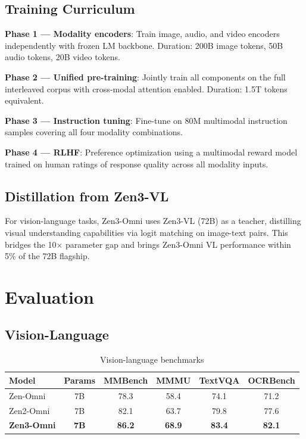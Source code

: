 \documentclass[11pt,a4paper]{article}
\begin{document}
\subsection{Training Curriculum}

\textbf{Phase 1 --- Modality encoders}: Train image, audio, and video encoders
independently with frozen LM backbone. Duration: 200B image tokens, 50B audio tokens,
20B video tokens.

\textbf{Phase 2 --- Unified pre-training}: Jointly train all components on the full
interleaved corpus with cross-modal attention enabled. Duration: 1.5T tokens equivalent.

\textbf{Phase 3 --- Instruction tuning}: Fine-tune on 80M multimodal instruction samples
covering all four modality combinations.

\textbf{Phase 4 --- RLHF}: Preference optimization using a multimodal reward model
trained on human ratings of response quality across all modality inputs.

\subsection{Distillation from Zen3-VL}

For vision-language tasks, Zen3-Omni uses Zen3-VL (72B) as a teacher, distilling
visual understanding capabilities via logit matching on image-text pairs. This
bridges the 10$\times$ parameter gap and brings Zen3-Omni VL performance within
5\% of the 72B flagship.

\section{Evaluation}
\label{sec:eval}

\subsection{Vision-Language}

\begin{table}[H]
\centering
\caption{Vision-language benchmarks}
\begin{tabular}{lccccc}
\toprule
\textbf{Model} & \textbf{Params} & \textbf{MMBench} & \textbf{MMMU} & \textbf{TextVQA} & \textbf{OCRBench} \\
\midrule
Zen-Omni     & 7B & 78.3 & 58.4 & 74.1 & 71.2 \\
Zen2-Omni    & 7B & 82.1 & 63.7 & 79.8 & 77.6 \\
\textbf{Zen3-Omni} & \textbf{7B} & \textbf{86.2} & \textbf{68.9} & \textbf{83.4} & \textbf{82.1} \\
\bottomrule
\end{tabular}
\label{tab:vl}
\end{table}
\end{document}
